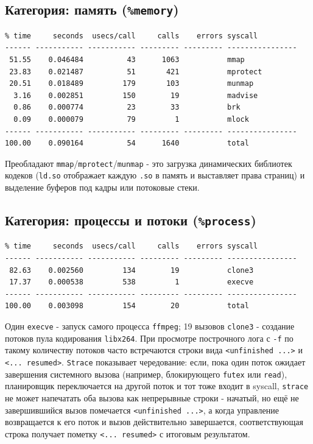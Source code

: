\documentclass[12pt,a4paper]{article}
\begin{document}
\subsection{Категория: память (\texttt{\%memory})}
\begin{lstlisting}
% time     seconds  usecs/call     calls    errors syscall
------ ----------- ----------- --------- --------- ----------------
 51.55    0.046484          43      1063           mmap
 23.83    0.021487          51       421           mprotect
 20.51    0.018489         179       103           munmap
  3.16    0.002851         150        19           madvise
  0.86    0.000774          23        33           brk
  0.09    0.000079          79         1           mlock
------ ----------- ----------- --------- --------- ----------------
100.00    0.090164          54      1640           total
\end{lstlisting}
Преобладают \texttt{mmap}/\texttt{mprotect}/\texttt{munmap} - это загрузка
динамических библиотек кодеков (\texttt{ld.so} отображает каждую \texttt{.so} в
память и выставляет права страниц) и выделение буферов под кадры или потоковые стеки.

\subsection{Категория: процессы и потоки (\texttt{\%process})}
\begin{lstlisting}
% time     seconds  usecs/call     calls    errors syscall
------ ----------- ----------- --------- --------- ----------------
 82.63    0.002560         134        19           clone3
 17.37    0.000538         538         1           execve
------ ----------- ----------- --------- --------- ----------------
100.00    0.003098         154        20           total
\end{lstlisting}
Один \texttt{execve} - запуск самого процесса \texttt{ffmpeg}; 19 вызовов
\texttt{clone3} - создание потоков пула кодирования \texttt{libx264}.
При просмотре построчного лога с \texttt{-f} по такому
количеству потоков часто встречаются строки вида \texttt{<unfinished ...>} и
\texttt{<... resumed>}. \texttt{Strace} показывает чередование: если, пока один поток ожидает завершения системного вызова
(например, блокирующего \texttt{futex} или \texttt{read}), планировщик
переключается на другой поток и тот тоже входит в syscall, \texttt{strace}
не может напечатать оба вызова как непрерывные строки - начатый, но ещё не
завершившийся вызов помечается \texttt{<unfinished ...>}, а когда управление
возвращается к его поток и вызов действительно завершается, соответствующая
строка получает пометку \texttt{<... resumed>} с итоговым результатом.
\end{document}
